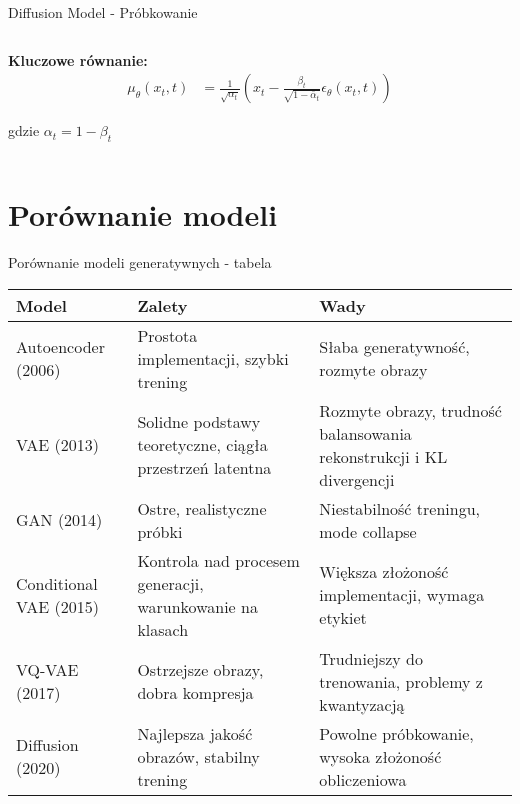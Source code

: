 \documentclass{beamer}
\begin{document}
\begin{frame}{Diffusion Model - Próbkowanie}
\begin{columns}
\begin{column}{0.5\textwidth}
      
      \medskip
      \textbf{Kluczowe równanie:}
      \begin{align*}
        \mu_\theta(x_t, t) &= \frac{1}{\sqrt{\alpha_t}} \left( x_t - \frac{\beta_t}{\sqrt{1-\bar{\alpha}_t}} \epsilon_\theta(x_t, t) \right)
      \end{align*}
      
      gdzie $\alpha_t = 1 - \beta_t$
    \end{column}
  \end{columns}
\end{frame}


\section{Porównanie modeli}

\begin{frame}{Porównanie modeli generatywnych - tabela}
  \begin{tabular}{|p{2.5cm}|p{3.5cm}|p{3.5cm}|}
    \hline
    \textbf{Model} & \textbf{Zalety} & \textbf{Wady} \\
    \hline
    Autoencoder (2006) & Prostota implementacji, szybki trening & Słaba generatywność, rozmyte obrazy \\
    \hline
    VAE (2013) & Solidne podstawy teoretyczne, ciągła przestrzeń latentna & Rozmyte obrazy, trudność balansowania rekonstrukcji i KL divergencji \\
    \hline
    GAN (2014) & Ostre, realistyczne próbki & Niestabilność treningu, mode collapse \\
    \hline
    Conditional VAE (2015) & Kontrola nad procesem generacji, warunkowanie na klasach & Większa złożoność implementacji, wymaga etykiet \\
    \hline
    VQ-VAE (2017) & Ostrzejsze obrazy, dobra kompresja & Trudniejszy do trenowania, problemy z kwantyzacją \\
    \hline
    Diffusion (2020) & Najlepsza jakość obrazów, stabilny trening & Powolne próbkowanie, wysoka złożoność obliczeniowa \\
    \hline
  \end{tabular}
\end{frame}
\end{document}
